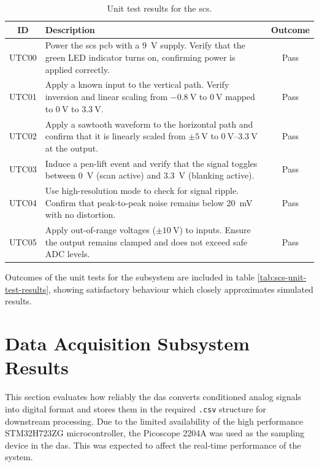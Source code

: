 \documentclass[class=report,11pt,crop=false]{standalone}
\begin{document}
	\begin{table}[ht!]
		\centering
		\begin{tabular}{|c|m{25em}|c|}
			\hline
			\textbf{ID} & \textbf{Description} & \textbf{Outcome} \\
			\hline
			UTC00 & Power the \acrshort{scs} \acrshort{pcb} with a \SI{9}{\volt} supply. Verify that the green LED indicator turns on, confirming power is applied correctly. & Pass \\
			\hline
			UTC01 & Apply a known input to the vertical path. Verify inversion and linear scaling from $-\SI{0.8}{\volt}$ to $\SI{0}{\volt}$ mapped to $\SI{0}{\volt}$ to $\SI{3.3}{\volt}$. & Pass \\
			\hline
			UTC02 & Apply a sawtooth waveform to the horizontal path and confirm that it is linearly scaled from $\pm\SI{5}{\volt}$ to $\SI{0}{\volt}$–$\SI{3.3}{\volt}$ at the output. & Pass \\
			\hline
			UTC03 & Induce a pen-lift event and verify that the signal toggles between \SI{0}{\volt} (scan active) and \SI{3.3}{\volt} (blanking active). & Pass \\
			\hline
			UTC04 & Use high-resolution mode to check for signal ripple. Confirm that peak-to-peak noise remains below \SI{20}{\milli\volt} with no distortion. & Pass \\
			\hline
			UTC05 & Apply out-of-range voltages ($\pm\SI{10}{\volt}$) to inputs. Ensure the output remains clamped and does not exceed safe ADC levels. & Pass \\
			\hline
		\end{tabular}
		\caption{Unit test results for the \acrshort{scs}.}
		\label{tab:scs-unit-tests}
	\end{table}
	
	Outcomes of the unit tests for the subsystem are included in table \ref{tab:scs-unit-test-results}, showing satisfactory behaviour which closely approximates simulated results.
	
	\section{Data Acquisition Subsystem Results}
	
	This section evaluates how reliably the \acrshort{das} converts conditioned analog signals into digital format and stores them in the required \texttt{.csv} structure for downstream processing. Due to the limited availability of the high performance STM32H723ZG microcontroller, the Picoscope 2204A was used as the sampling device in the \acrshort{das}. This was expected to affect the real-time performance of the system. 
	
\end{document}
